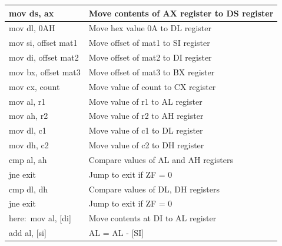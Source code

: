 \documentclass[10pt,a4paper]{article}
\begin{document}
\begin{flushleft}
\begin{table}[htb]
{\begin{tabular}{|l|l|}
\hline
mov ds, ax                                                       & Move contents of AX register to DS register   \\
\hline
mov dl, 0AH                                                      & Move hex value 0A to DL register              \\
\hline
mov si, offset mat1                                              & Move offset of mat1 to SI register            \\
\hline
mov di, offset mat2                                              & Move offset of mat2 to DI register            \\
\hline
mov bx, offset mat3                                              & Move offset of mat3 to BX register            \\
\hline
mov cx, count                                                    & Move value of count to CX register            \\
\hline
mov al, r1                                                       & Move value of r1 to AL register               \\
\hline
mov ah, r2                                                       & Move value of r2 to AH register               \\
\hline
mov dl, c1                                                       & Move value of c1 to DL register               \\
\hline
mov dh, c2                                                       & Move value of c2 to DH register               \\ 
\hline
cmp al, ah                                                       & Compare values of AL and AH registers         \\
\hline
jne exit                                                         & Jump to exit if ZF = 0                        \\
\hline
cmp dl, dh                                                       & Compare values of DL, DH registers            \\
\hline
jne exit                                                         & Jump to exit if ZF = 0                        \\
\hline
here:~mov al, [di]                                               & Move contents at DI to AL register            \\
\hline            
add al, [si]                                                     & AL = AL - [SI]                                \\

\end{tabular}}
\end{table}
\end{flushleft}
\end{document}
